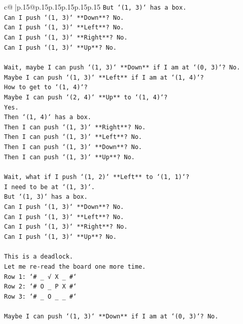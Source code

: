 \documentclass{article}
\begin{document}
{\begin{supertabular}{c@{$\;$}|p{.15\linewidth}@{}p{.15\linewidth}p{.15\linewidth}p{.15\linewidth}p{.15\linewidth}p{.15\linewidth}}
{{{\texttt{But `(1, 3)` has a box.} \\
\texttt{Can I push `(1, 3)` **Down**? No.} \\
\texttt{Can I push `(1, 3)` **Left**? No.} \\
\texttt{Can I push `(1, 3)` **Right**? No.} \\
\texttt{Can I push `(1, 3)` **Up**? No.} \\
\\ 
\texttt{Wait, maybe I can push `(1, 3)` **Down** if I am at `(0, 3)`? No.} \\
\texttt{Maybe I can push `(1, 3)` **Left** if I am at `(1, 4)`?} \\
\texttt{How to get to `(1, 4)`?} \\
\texttt{Maybe I can push `(2, 4)` **Up** to `(1, 4)`?} \\
\texttt{Yes.} \\
\texttt{Then `(1, 4)` has a box.} \\
\texttt{Then I can push `(1, 3)` **Right**? No.} \\
\texttt{Then I can push `(1, 3)` **Left**? No.} \\
\texttt{Then I can push `(1, 3)` **Down**? No.} \\
\texttt{Then I can push `(1, 3)` **Up**? No.} \\
\\ 
\texttt{Wait, what if I push `(1, 2)` **Left** to `(1, 1)`?} \\
\texttt{I need to be at `(1, 3)`.} \\
\texttt{But `(1, 3)` has a box.} \\
\texttt{Can I push `(1, 3)` **Down**? No.} \\
\texttt{Can I push `(1, 3)` **Left**? No.} \\
\texttt{Can I push `(1, 3)` **Right**? No.} \\
\texttt{Can I push `(1, 3)` **Up**? No.} \\
\\ 
\texttt{This is a deadlock.} \\
\texttt{Let me re{-}read the board one more time.} \\
\texttt{Row 1: `\# \_ √ X \_ \#`} \\
\texttt{Row 2: `\# O \_ P X \#`} \\
\texttt{Row 3: `\# \_ O \_ \_ \#`} \\
\\ 
\texttt{Maybe I can push `(1, 3)` **Down** if I am at `(0, 3)`? No.} \\
}}}
\end{supertabular}}
\end{document}
